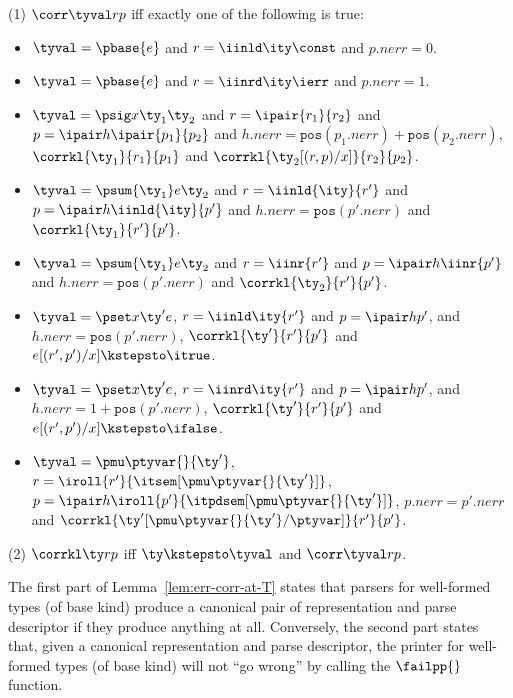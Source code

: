 \begin{definition}
(1) $\corr \tyval r p$ iff exactly one of the following is true:
  \begin{itemize}
  \item $\tyval = \pbase{e}$ and $r = \iinld \ity \const$ and $p.{nerr} = 0$.
  \item $\tyval = \pbase{e}$ and $r = \iinrd \ity \ierr$ and $p.{nerr} = 1$.
  \item $\tyval = \psig x {\ty_1} {\ty_2}$ and $r =\ipair {r_1} {r_2}$ and $p =
    \ipair h {\ipair {p_1} {p_2}}$ 
    and $h.{nerr} = \mathtt{pos}(p_1.{nerr}) + \mathtt{pos}(p_2.{nerr})$, $\corrkl
    {\ty_1} {r_1} {p_1}$ and $\corrkl {\ty_2[(r,p)/x]} {r_2} {p_2}$.
  \item $\tyval = \psum {\ty_1} e {\ty_2}$ and $r =\iinld {\ity}{r'}$
    and $p = \ipair h {\iinld {\ity}{p'}}$
    and $h.{nerr} = \mathtt{pos}(p'.{nerr})$ and $\corrkl
    {\ty_1} {r'} {p'}$.
  \item $\tyval = \psum {\ty_1} e {\ty_2}$ and $r =\iinr {r'}$
    and $p = \ipair h {\iinr {p'}}$
    and $h.{nerr} = \mathtt{pos}(p'.{nerr})$ and $\corrkl
    {\ty_2} {r'} {p'}$.
  \item $\tyval = \pset x {\ty'} e$, $r = \iinld \ity {r'}$ and $p =
    \ipair h {p'}$, 
    and $h.{nerr} = \mathtt{pos}(p'.{nerr})$, $\corrkl {\ty'}{r'}{p'}$
    and $e[(r',p')/x] \kstepsto\itrue$.
  \item $\tyval = \pset x {\ty'} e$, $r = \iinrd \ity {r'}$
    and $p = \ipair h {p'}$,
    and $h.{nerr} = 1 + \mathtt{pos}(p'.{nerr})$,
    $\corrkl {\ty'}{r'}{p'}$ and $e[(r',p')/x] \kstepsto \ifalse$.
  \item $\tyval = \pmu \ptyvar {} {\ty'}$, 
    $r = \iroll{r'}{\itsem[\pmu \ptyvar {} {\ty'}]}$, $p =
    \ipair h {\iroll{p'}{
                \itpdsem[\pmu \ptyvar {} {\ty'}]}}$, 
        $p.{nerr} = p'.{nerr}$ 
    and
    $\corrkl {\ty'[\pmu \ptyvar {} {\ty'}/\ptyvar]} {r'} {p'}$. \\
  \end{itemize}

\noindent
(2) $\corrkl \ty r p$ iff $\ty \kstepsto \tyval$ and $\corr \tyval r p$.
\end{definition}

The first part of Lemma~\ref{lem:err-corr-at-T} states that parsers for
well-formed types (of base kind) produce a canonical pair of
representation and parse descriptor if they produce anything at all.
Conversely, the second part states that, given a canonical representation and
parse descriptor, the printer for well-formed types (of base kind)
will not ``go wrong'' by calling the $\failpp{}$ function.

